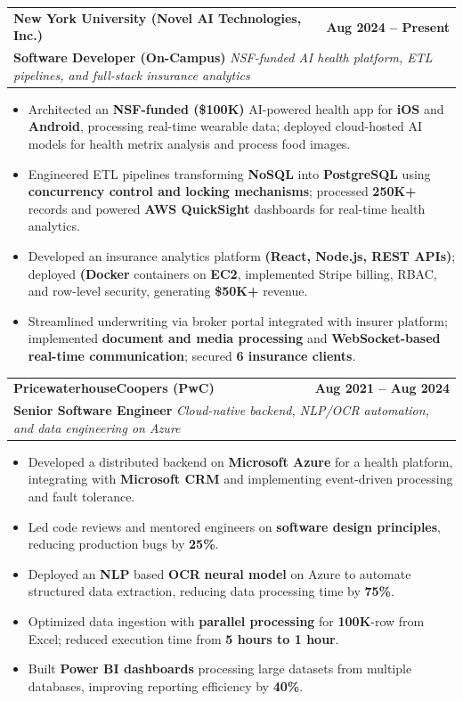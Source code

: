 \documentclass[letterpaper,10pt]{article}
\makeatletter
\newcommand{\resumeItem}[1]{
\item\small{{#1}\vspace{-3.5pt}}
}
\newcommand{\resumeSubheading}[4]{
\vspace{6pt} %
\item
\begin{tabular*}{1.0\textwidth}[t]{l@{\extracolsep{\fill}}r}
\textbf{#1} & \textbf{\small #2} \\
\multicolumn{2}{l}{\textbf{\small#3} \textbar{} \textit{\small #4}} \\
\end{tabular*}\vspace{-5.5pt}
}
\newcommand{\resumeItemListStart}{\begin{itemize}[leftmargin=*, itemsep=0pt, topsep=0pt]}
\newcommand{\resumeItemListEnd}{\end{itemize}\vspace{-3pt}}
\makeatother
\begin{document}
\resumeSubheading
  {New York University (Novel AI Technologies, Inc.)
  \href{https://mybeatshealth.com/home}{\faExternalLink}
  \href{https://broker.mybeatshealth.com/}{\faExternalLink}}
  {Aug 2024 -- Present}
  {Software Developer (On-Campus)}{NSF-funded AI health platform, ETL pipelines, and full-stack insurance analytics}
   \resumeItemListStart
      \resumeItem{Architected an \textbf{NSF-funded (\$100K)} AI-powered health app for \textbf{iOS} and \textbf{Android}, processing real-time wearable data; deployed cloud-hosted AI models for health metrix analysis and process food images.}
      \resumeItem{Engineered ETL pipelines transforming \textbf{NoSQL} into \textbf{PostgreSQL} using \textbf{concurrency control and locking mechanisms}; processed \textbf{250K+} records and powered \textbf{AWS QuickSight} dashboards for real-time health analytics.}
      \resumeItem{Developed an insurance analytics platform \textbf{(React, Node.js, REST APIs)}; deployed \textbf{(Docker} containers on \textbf{EC2}, implemented Stripe billing, RBAC, and row-level security, generating \textbf{\$50K+} revenue.}
   \resumeItem{Streamlined underwriting via broker portal integrated with insurer platform; implemented \textbf{document and media processing} and \textbf{WebSocket-based real-time communication}; secured \textbf{6 insurance clients}.}
    \resumeItemListEnd

        \resumeSubheading
      {PricewaterhouseCoopers (PwC)}{Aug 2021 -- Aug 2024}
      {Senior Software Engineer}{Cloud-native backend, NLP/OCR automation, and data engineering on Azure}
\resumeItemListStart
  \resumeItem{Developed a distributed backend on \textbf{Microsoft Azure} for a health platform, integrating with \textbf{Microsoft CRM} and implementing event-driven processing and fault tolerance.}
  
\resumeItem{Led code reviews and mentored engineers on \textbf{software design principles}, reducing production bugs by \textbf{25\%}.}
  
  \resumeItem{Deployed an \textbf{NLP} based \textbf{OCR} \textbf{neural model} on Azure to automate structured data extraction, reducing data processing time by \textbf{75\%}.}
  
  \resumeItem{Optimized data ingestion with \textbf{parallel processing} for \textbf{100K}-row from Excel; reduced execution time from \textbf{5 hours to 1 hour}.}
  \resumeItem{Built \textbf{Power BI dashboards} processing large datasets from multiple databases, improving reporting efficiency by \textbf{40\%}.}
\resumeItemListEnd
\end{document}
